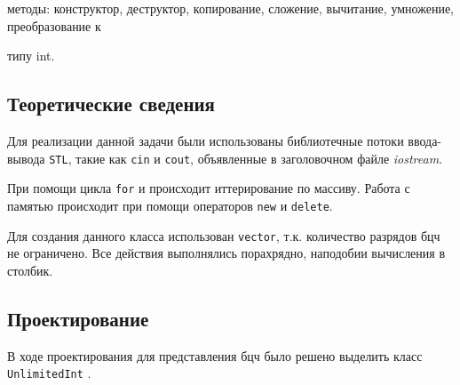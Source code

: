 \documentclass[12pt,a4paper]{report}
\begin{document}
методы: конструктор, деструктор, копирование, сложение, вычитание, умножение, преобразование к 

типу int. 

\subsection{Теоретические сведения}
\hspace{\parindent}Для реализации данной задачи были использованы библиотечные потоки ввода-вывода \verb+STL+, такие как \verb+cin+ и \verb+cout+, объявленные в заголовочном файле \textit{iostream}.

При помощи цикла \verb+for+ и происходит иттерирование по массиву. Работа с памятью происходит при помощи операторов \verb+new+ и \verb+delete+.

Для создания данного класса использован \verb+vector+, т.к. количество разрядов бцч не ограничено. Все действия выполнялись порахрядно, наподобии вычисления в столбик.

\subsection{Проектирование}
\hspace{\parindent}В ходе проектирования для представления бцч было решено выделить класс \verb+UnlimitedInt+ .
\end{document}
